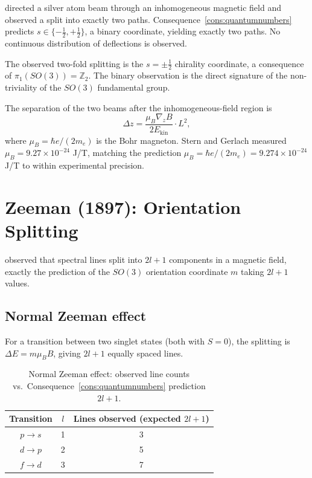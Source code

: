 \citet{stern1921,gerlach1922} directed a silver atom beam through an
inhomogeneous magnetic field and observed a split into exactly two paths.
Consequence~\ref{cons:quantumnumbers} predicts $s\in\{-\tfrac{1}{2},+\tfrac{1}{2}\}$,
a binary coordinate, yielding exactly two paths.  No continuous distribution
of deflections is observed.

The observed two-fold splitting is the $s=\pm\tfrac{1}{2}$ chirality
coordinate, a consequence of $\pi_{1}(SO(3))=\mathbb{Z}_{2}$.  The binary
observation is the direct signature of the non-triviality of the $SO(3)$
fundamental group.

The separation of the two beams after the inhomogeneous-field region is
\begin{equation*}
  \Delta z=\frac{\mu_{B}\nabla_{z}B}{2E_{\text{kin}}}\cdot L^{2},
\end{equation*}
where $\mu_{B}=\hbar e/(2m_{e})$ is the Bohr magneton.  Stern and Gerlach
measured $\mu_{B}=9.27\times 10^{-24}$ J/T, matching the prediction
$\mu_{B}=\hbar e/(2m_{e})=9.274\times 10^{-24}$ J/T to within experimental
precision.

\section{Zeeman (1897): Orientation Splitting}
\label{sec:zeeman-ch25}

\citet{zeeman1897} observed that spectral lines split into $2l+1$ components
in a magnetic field, exactly the prediction of the $SO(3)$ orientation
coordinate $m$ taking $2l+1$ values.

\subsection{Normal Zeeman effect}

For a transition between two singlet states (both with $S=0$), the
splitting is $\Delta E=m\mu_{B}B$, giving $2l+1$ equally spaced lines.

\begin{table}[htbp]
\centering
\caption{Normal Zeeman effect: observed line counts vs.\
Consequence~\ref{cons:quantumnumbers} prediction $2l+1$.}
\label{tab:zeeman-normal}
\begin{tabular}{@{}ccc@{}}
\toprule
Transition & $l$ & Lines observed (expected $2l+1$) \\
\midrule
$p\to s$ & 1 & 3 \\
$d\to p$ & 2 & 5 \\
$f\to d$ & 3 & 7 \\
\bottomrule
\end{tabular}
\end{table}

